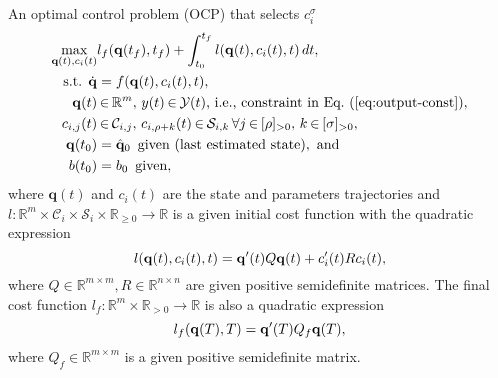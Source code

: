 \documentclass[letterpaper,10pt,conference,twoside]{IEEEtran}
\theoremstyle{definition}
\begin{document}
An optimal control problem (OCP) that selects %
{\color{black} $c_i^\sigma$} %
\begin{subequations}\small\label{eq:ocp-output-mpc}\begin{align}
  \max_{\mathbf{q}(t),c_i(t)}&{l_f(\mathbf{q}(t_f),t_f)+\int_{t_0}^{t_f}{l(\mathbf{q}(t),c_i(t),t)\,dt}},\label{eq:ocp-costs}\\
  \text{s.t. }\dot{\mathbf{q}}&=f(\mathbf{q}(t),c_i(t),t),\label{eq:dyn-evol}\\
  \mathbf{q}(t)&\hspace*{-.2ex}\in\hspace*{-.2ex}\mathbb{R}^m,\,y(t)\hspace*{-.2ex}\in\hspace*{-.2ex}\mathcal{Y}(t)\text{, i.e., constraint in Eq.~(\ref{eq:output-const})},\label{eq:batt-const-mpc}\\
  c_{i,j}(t)&\hspace*{-.2ex}\in\hspace*{-.2ex}\mathcal{C}_{i,j},\,c_{i,\rho+k}(t)\hspace*{-.2ex}\in\hspace*{-.2ex}\mathcal{S}_{i,k}\,\forall j\hspace*{-.2ex}\in\hspace*{-.2ex}[\rho]_{>0},\,k\hspace*{-.2ex}\in\hspace*{-.2ex}[\sigma]_{>0},\label{eq:state-cont-const-mpc}\\
  \mathbf{q}(t_0)&=\hat{\mathbf{q}}_0\,\,\,\text{given (last estimated state)},\text{ and}\label{eq:ocp-outp-mpc-state-est}\\
  b(t_0)&=b_0\,\,\,\text{given}\label{eq:ocp-outp-bat},
\end{align}\end{subequations}
where $\mathbf{q}(t)$ and $c_i(t)$ are the state and parameters trajectories and $l:\mathbb{R}^m\times\mathcal{C}_i\times\mathcal{S}_i\times\mathbb{R}_{\geq 0}\rightarrow\mathbb{R}$ is a given initial cost function with the quadratic expression
\vspace*{-.5ex}
\begin{equation}\label{eq:insta-cost-mpc}
  l(\mathbf{q}(t),c_i(t),t)=\mathbf{q}'(t)Q\mathbf{q}(t)+c_i'(t)Rc_i(t),
  \vspace*{-.5ex}
\end{equation}
where $Q\in\mathbb{R}^{m\times m},R\in\mathbb{R}^{n\times n}$ are given positive semidefinite matrices. %
The final cost function $l_f:\mathbb{R}^m\times\mathbb{R}_{> 0}\rightarrow\mathbb{R}$ is also a quadratic expression %
\vspace*{-.5ex}
\begin{equation}\label{eq:final-cost-mpc}
  l_f(\mathbf{q}(T),T)=\mathbf{q}'(T)Q_f\mathbf{q}(T), 
  \vspace*{-.5ex}
\end{equation}
where $Q_f\in\mathbb{R}^{m\times m}$ is a given positive semidefinite matrix.
\end{document}
